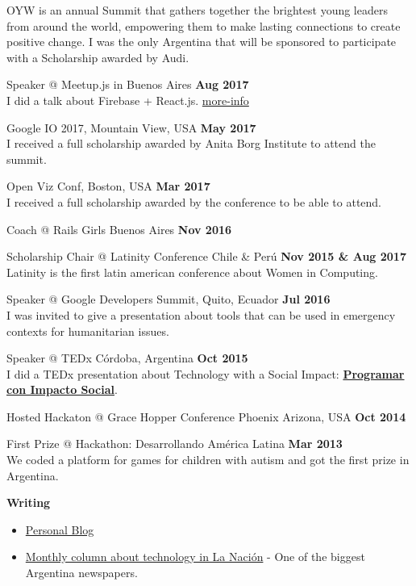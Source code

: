 \documentclass[margin,line]{resume}
\begin{document}
\begin{resume}
\begin{list2}
OYW is an annual Summit that gathers together the brightest young leaders from around the world, empowering them to make lasting connections to create positive change.  I was the only Argentina that will be sponsored to participate with a Scholarship awarded by Audi.


\item Speaker @ Meetup.js in Buenos Aires \hfill \textbf{Aug 2017}
\\
I did a talk about Firebase + React.js. \href{https://www.meetup.com/Meetup-js/events/242439836/?eventId=242439836}{more-info}

\item Google IO 2017, Mountain View, USA \hfill \textbf{May 2017}
\\
I received a full scholarship awarded by Anita Borg Institute to attend the summit.


\item Open Viz Conf, Boston, USA \hfill \textbf{Mar 2017}
\\ I received a full scholarship awarded by the conference to be able to attend.

\item Coach  @ Rails Girls Buenos Aires \hfill \textbf{Nov 2016}

\item Scholarship Chair  @ Latinity Conference Chile \& Per\'u \hfill \textbf{Nov 2015 \& Aug 2017}\\
Latinity is the first latin american conference about Women in Computing.

\item Speaker @ Google Developers Summit, Quito, Ecuador \hfill \textbf{Jul 2016}  \\
I was invited to give a presentation about tools that can be used in emergency contexts for humanitarian issues.

\item Speaker @ TEDx C\'ordoba, Argentina \hfill \textbf{Oct 2015}  \\
I did a TEDx presentation about Technology with a Social Impact: \href{https://www.youtube.com/watch?v=0cx8UwdN-g4&t=1s}{\textbf{Programar con Impacto Social}}.

\item Hosted Hackaton @ Grace Hopper Conference Phoenix Arizona, USA \hfill \textbf{Oct 2014} 

\item First Prize @ Hackathon: Desarrollando Am\'erica Latina \hfill \textbf{Mar 2013} \\
We coded a platform for games for children with autism and got the first prize in Argentina.
\end{list2}

\textbf{Writing}
\begin{itemize}
\item \href{https://medium.com/@carohadad} {Personal Blog}
\item \href{http://www.lanacion.com.ar/autor/carolina-hadad-10522} {Monthly column about technology in La Naci\'on} - One of the biggest Argentina newspapers.
\end{itemize}

    

\end{resume}
\end{document}
